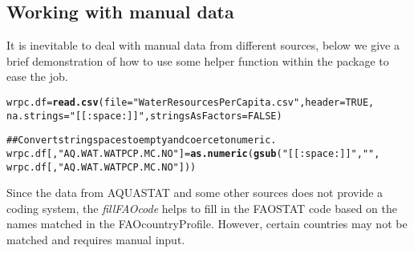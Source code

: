 \documentclass{article}\usepackage{graphicx, color}
\makeatletter
\newcommand{\hlfunctioncall}[1]{\textcolor[rgb]{0.501960784313725,0,0.329411764705882}{\textbf{#1}}}%
\newcommand{\hlstring}[1]{\textcolor[rgb]{0.6,0.6,1}{#1}}%
\newcommand{\hlcomment}[1]{\textcolor[rgb]{0.180392156862745,0.6,0.341176470588235}{#1}}%
\newenvironment{kframe}{%
 \def\at@end@of@kframe{}%
 \ifinner\ifhmode%
  \def\at@end@of@kframe{\end{minipage}}%
  \begin{minipage}{\columnwidth}%
 \fi\fi%
 \def\FrameCommand##1{\hskip\@totalleftmargin \hskip-\fboxsep
 \colorbox{shadecolor}{##1}\hskip-\fboxsep
     \hskip-\linewidth \hskip-\@totalleftmargin \hskip\columnwidth}%
 \MakeFramed {\advance\hsize-\width
   \@totalleftmargin\z@ \linewidth\hsize
   \@setminipage}}%
 {\par\unskip\endMakeFramed%
 \at@end@of@kframe}
\newenvironment{knitrout}{}{} %
\makeatother
\begin{document}
\subsection{Working with manual data}
It is inevitable to deal with manual data from different sources,
below we give a brief demonstration of how to use some helper function
within the package to ease the job.

\begin{knitrout}
\color{fgcolor}\begin{kframe}
\begin{alltt}
wrpc.df = \hlfunctioncall{read.csv}(file = \hlstring{"WaterResourcesPerCapita.csv"}, header = TRUE,
  na.strings = \hlstring{"[[:space:]]"}, stringsAsFactors = FALSE)

\hlcomment{## Convert string spaces to empty and coerce to numeric.}
wrpc.df[, \hlstring{"AQ.WAT.WATPCP.MC.NO"}] = \hlfunctioncall{as.numeric}(\hlfunctioncall{gsub}(\hlstring{"[[:space:]]"}, \hlstring{""},
         wrpc.df[, \hlstring{"AQ.WAT.WATPCP.MC.NO"}]))
\end{alltt}
\end{kframe}
\end{knitrout}


Since the data from AQUASTAT and some other sources does not provide a
coding system, the \emph{fillFAOcode} helps to fill in the FAOSTAT code
based on the names matched in the FAOcountryProfile. However, certain
countries may not be matched and requires manual input.
\end{document}
